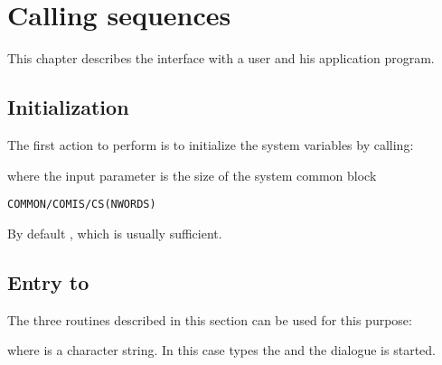 \chapter{Calling sequences}
 
This chapter describes the \COMIS{} interface with a user
and his application program.

\section{Initialization}
 
The first action to perform is to initialize
the \COMIS{} system variables by calling:


where the input parameter  is the size of the system common block
\begin{alltt} 
 COMMON /COMIS/CS(NWORDS)
\end{alltt} 
By default , which is usually sufficient.

\section{Entry to \protect\COMIS{}}
 
The three routines described in this section can be used for this purpose:

 
where  is a character string. In this case
\COMIS{} types the  and the dialogue is started.

